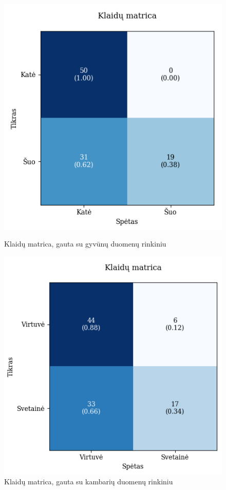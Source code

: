 \documentclass{VUMIFPSbakalaurinis}
\begin{document}
\begin{figure}[!htbp]
    \centering
    \begin{minipage}[b]{0.48\textwidth}
      \includegraphics[width=\textwidth]{img/GrapthsNEW/Small/animal/20/KM_DC_S_20.png}
      \caption{Klaidų matrica, gauta su gyvūnų duomenų rinkiniu}
    \end{minipage}
    \hspace{2mm}
    \begin{minipage}[b]{0.48\textwidth}
      \includegraphics[width=\textwidth]{img/GrapthsNEW/Small/room/20/KM_R_S_20.png}
      \caption{Klaidų matrica, gauta su kambarių duomenų rinkiniu}
    \end{minipage}
\end{figure}
\end{document}
